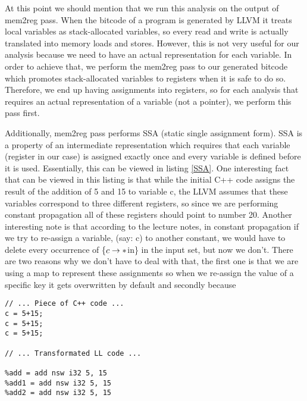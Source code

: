 At this point we should mention that we run this analysis on the output of mem2reg pass. When the bitcode of a program is generated by LLVM it  treats local variables as stack-allocated variables, so every read and write is actually translated into memory loads and stores. However, this is not very useful for our analysis because we need to have an actual representation for each variable. In order to achieve that, we perform the mem2reg pass to our generated bitcode which promotes stack-allocated variables to registers when it is safe to do so. Therefore, we end up having assignments into registers, so for each analysis that requires an actual representation of a variable (not a pointer), we perform this pass first. 

Additionally, mem2reg pass performs SSA (static single assignment form). SSA is a property of an intermediate representation which requires that each variable (register in our case) is assigned exactly once and every variable is defined before it is used. Essentially, this can be viewed in listing \ref{SSA}. One interesting fact that can be viewed in this listing is that while the initial C++ code assigns the result of the addition of 5 and 15 to variable c, the LLVM assumes that these variables correspond to three different registers, so since we are performing constant propagation all of these registers should point to number 20. Another interesting note is that according to the lecture notes, in constant propagation if we try to re-assign a variable, (say: c) to another constant, we would have to delete every occurrence of \{$c\rightarrow*$in\} in the input set, but now we don't. There are two reasons why we don't have to deal with that, the first one is that we are using a map to represent these assignments so when we re-assign the value of a specific key it gets overwritten by default and secondly because 




\begin{lstlisting}[caption=SSA preview, label=SSA]
// ... Piece of C++ code ...
c = 5+15;
c = 5+15;
c = 5+15;

// ... Transformated LL code ...

%add = add nsw i32 5, 15
%add1 = add nsw i32 5, 15
%add2 = add nsw i32 5, 15

\end{lstlisting}



